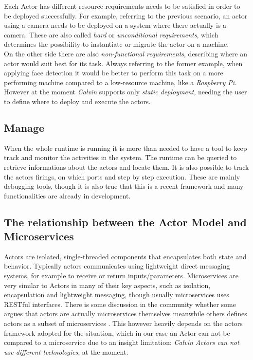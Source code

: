   Each Actor has different resource requirements needs to be satisfied in order to be
  deployed successfully. For example, referring to the previous scenario, an actor
  using a camera needs to be deployed on a system where there actually is a camera. These
  are also called \textit{hard} or \textit{unconditional requirements}, which determines
  the possibility to instantiate or migrate the actor on a machine. \\
  On the other side there are also \textit{non-functional requirements}, describing where
  an actor would suit best for its task. Always referring to the former example, when applying
  face detection it would be better to perform this task on a more performing machine compared to
  a low-resource machine, like a \textit{Raspberry Pi}.\\
  However at the moment \textit{Calvin} supports only \textit{static deployment}, needing the user
  to define where to deploy and execute the actors.

\subsection{Manage}
  When the whole runtime is running it is more than needed to have a tool to keep
  track and monitor the activities in the system. The runtime can be queried to retrieve
  informations about the actors and locate them. It is also possible to track
  the actors firings, on which ports and step by step execution. These are mainly
  debugging tools, though it is also true that this is a recent framework and many
  functionalities are already in development.


\subsection{The relationship between the Actor Model and Microservices}
Actors are isolated, single-threaded components that encapsulates both state and behavior.
Typically actors communicates using lightweight direct messaging systems, for example
to receive or return inputs/parameters. Microservices are very similar to Actors in many
of their key aspects, such as isolation, encapsulation and lightweight messaging, though
usually microservices uses RESTful interfaces. There is some discussion
in the community whether some argues that actors are actually microservices
themselves \cite{microarch1} meanwhile others defines actors as a subset of microservices \cite{microactor}.
This however heavily depends on the actors framework adopted for the situation, which in our
case an Actor can not be compared to a microservice due to an insight limitation: \textit{Calvin Actors can not
use different technologies}, at the moment.

